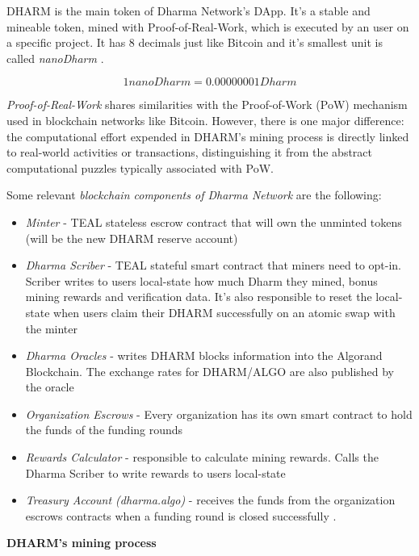 DHARM is the main token of Dharma Network's DApp. It's a stable and mineable token, mined with Proof-of-Real-Work, which is executed by an user on a specific project. It has 8 decimals just like Bitcoin and it's smallest unit is called \textit{nanoDharm} \cite{dharma}.

\begin{equation}
    1 nanoDharm = 0.0000 0001 Dharm
\end{equation}

\textit{Proof-of-Real-Work} shares similarities with the Proof-of-Work (PoW) mechanism used in blockchain networks like Bitcoin. However, there is one major difference: the computational effort expended in DHARM's mining process is directly linked to real-world activities or transactions, distinguishing it from the abstract computational puzzles typically associated with PoW.\newline

Some relevant \textit{blockchain components of Dharma Network} are the following:

\begin{itemize}
    \item \textit{Minter} - TEAL stateless escrow contract that will own the unminted tokens (will be the new DHARM reserve account)
    \item \textit{Dharma Scriber} - TEAL stateful smart contract that miners need to opt-in. Scriber writes to users local-state how much Dharm they mined, bonus mining rewards and verification data. It’s also responsible to reset the local-state when users claim their DHARM successfully on an atomic swap with the minter
    \item \textit{Dharma Oracles} - writes DHARM blocks information into the Algorand Blockchain. The exchange rates for DHARM/ALGO are also published by the oracle
    \item \textit{Organization Escrows} - Every organization has its own smart contract to hold the funds of the funding rounds
    \item \textit{Rewards Calculator} - responsible to calculate mining rewards. Calls the Dharma Scriber to write rewards to users local-state
    \item \textit{Treasury Account (dharma.algo)} - receives the funds from the organization escrows contracts when a funding round is closed successfully \cite{dharma}.
\end{itemize}

\textbf{DHARM's mining process}\newline

